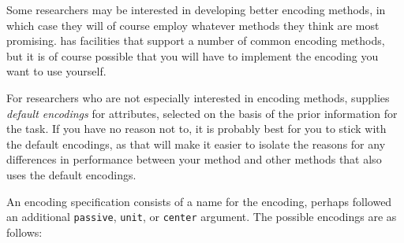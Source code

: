 Some researchers may be interested in developing better encoding
methods, in which case they will of course employ whatever methods
they think are most promising.  \delve{} has facilities that support
a number of common encoding methods, but it is of course possible
that you will have to implement the encoding you want to use yourself.

For researchers who are not especially interested in encoding methods,
\delve{} supplies \emph{default encodings} for attributes, selected on
the basis of the prior information for the task.  If you have no
reason not to, it is probably best for you to stick with the default
encodings, as that will make it easier to isolate the reasons for any
differences in performance between your method and other methods
that also uses the default encodings.

An encoding specification consists of a name for the encoding, perhaps
followed an additional \texttt{passive}, \texttt{unit}, or
\texttt{center} argument. The possible encodings are as follows:\vspace{-4pt}

